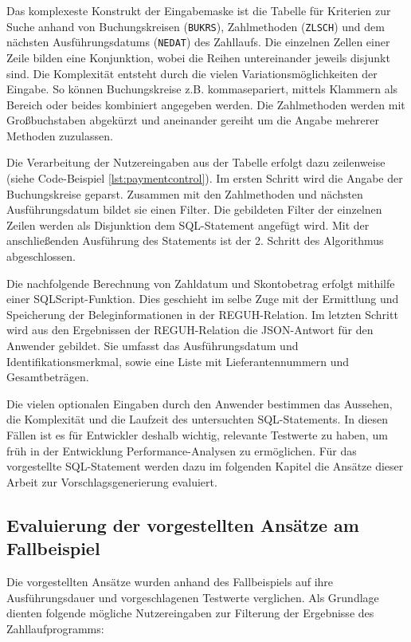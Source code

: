 Das komplexeste Konstrukt der Eingabemaske ist die Tabelle für Kriterien zur Suche anhand von Buchungskreisen (\texttt{BUKRS}), Zahlmethoden (\texttt{ZLSCH}) und dem nächsten Ausführungsdatums (\texttt{NEDAT}) des Zahllaufs.
Die einzelnen Zellen einer Zeile bilden eine Konjunktion, wobei die Reihen untereinander jeweils disjunkt sind.
Die Komplexität entsteht durch die vielen Variationsmöglichkeiten der Eingabe.
So können Buchungskreise z.B. kommasepariert, mittels Klammern als Bereich oder beides kombiniert angegeben werden.
Die Zahlmethoden werden mit Großbuchstaben abgekürzt und aneinander gereiht um die Angabe mehrerer Methoden zuzulassen.

Die Verarbeitung der Nutzereingaben aus der Tabelle erfolgt dazu zeilenweise (siehe Code-Beispiel \ref{lst:paymentcontrol}).
Im ersten Schritt wird die Angabe der Buchungskreise geparst.
Zusammen mit den Zahlmethoden und nächsten Ausführungsdatum bildet sie einen Filter.
Die gebildeten Filter der einzelnen Zeilen werden als Disjunktion dem SQL-Statement angefügt wird.
Mit der anschließenden Ausführung des Statements ist der 2. Schritt des Algorithmus abgeschlossen.

Die nachfolgende Berechnung von Zahldatum und Skontobetrag erfolgt mithilfe einer SQLScript-Funktion.
Dies geschieht im selbe Zuge mit der Ermittlung und Speicherung der Beleginformationen in der REGUH-Relation.
Im letzten Schritt wird aus den Ergebnissen der REGUH-Relation die JSON-Antwort für den Anwender gebildet.
Sie umfasst das Ausführungsdatum und Identifikationsmerkmal, sowie eine Liste mit Lieferantennummern und Gesamtbeträgen.

Die vielen optionalen Eingaben durch den Anwender bestimmen das Aussehen, die Komplexität und die Laufzeit des untersuchten SQL-Statements.
In diesen Fällen ist es für Entwickler deshalb wichtig, relevante Testwerte zu haben, um früh in der Entwicklung Performance-Analysen zu ermöglichen.
Für das vorgestellte SQL-Statement werden dazu im folgenden Kapitel die Ansätze dieser Arbeit zur Vorschlagsgenerierung evaluiert.

\subsection{Evaluierung der vorgestellten Ansätze am Fallbeispiel}
Die vorgestellten Ansätze wurden anhand des Fallbeispiels auf ihre Ausführungsdauer und vorgeschlagenen Testwerte verglichen.
Als Grundlage dienten folgende mögliche Nutzereingaben zur Filterung der Ergebnisse des Zahllaufprogramms:

